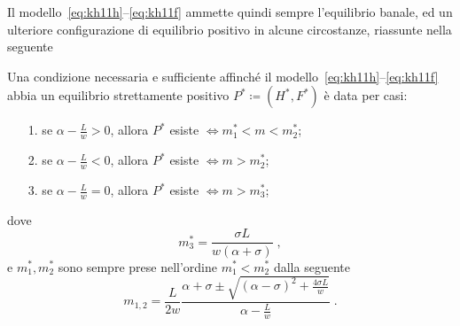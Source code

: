 Il modello~\eqref{eq:kh11h}--\eqref{eq:kh11f} ammette quindi sempre l'equilibrio banale, ed un ulteriore
configurazione di equilibrio positivo in alcune circostanze, riassunte nella seguente
\begin{proposizione}
    Una condizione necessaria e sufficiente affinché il modello~\eqref{eq:kh11h}--\eqref{eq:kh11f} abbia
    un equilibrio strettamente positivo $P^* \coloneq (H^*, F^*)$ è data per casi:
    \begin{itemize}
        \item[1.] se $\alpha - \frac{L}{w} >0$, allora $P^*$ esiste $\iff m_1^* < m < m_2^*$;
        \item[2.] se $\alpha - \frac{L}{w} <0$, allora $P^*$ esiste $\iff m > m_2^*$;
        \item[3.] se $\alpha - \frac{L}{w} =0$, allora $P^*$ esiste $\iff m > m_3^*$;
    \end{itemize}
    dove
    \begin{equation}
        m_3^* = \frac{ \sigma L}{ w (\alpha + \sigma) } \; ,
        \label{eq:FstarPosM3}
    \end{equation}
    e $m_1^*, m_2^*$ sono sempre prese nell'ordine $m_1^* < m_2^*$ dalla seguente
    \begin{equation}
        m_{1,2} = \frac{L}{2w} \frac{ \alpha + \sigma \pm \sqrt{ {(\alpha - \sigma)}^2 +\frac{4 \sigma L}{w}  } }
        {\alpha -\frac{L}{w}} \; .
        \label{eq:FstarPosM12}
    \end{equation}

    \label{teo:esistenzPosF} %
\end{proposizione}


